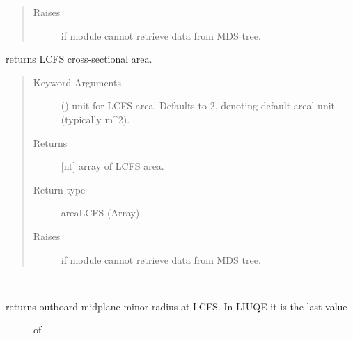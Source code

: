 \documentclass[letterpaper,10pt,english]{sphinxmanual}
\begin{document}
\begin{fulllineitems}
\begin{fulllineitems}
\begin{quote}
\begin{description}
\item[{Raises}] \leavevmode
{} \textendash{} if module cannot retrieve data from MDS tree.

\end{description}\end{quote}

\end{fulllineitems}


\begin{fulllineitems}
\label{\detokenize{eqtools:eqtools.TCVLIUQE.TCVLIUQETree.getAreaLCFS}}
returns LCFS cross-sectional area.
\begin{quote}\begin{description}
\item[{Keyword Arguments}] \leavevmode
{} () \textendash{} unit for LCFS area.  Defaults to 2,
denoting default areal unit (typically m\textasciicircum{}2).

\item[{Returns}] \leavevmode
{[}nt{]} array of LCFS area.

\item[{Return type}] \leavevmode
areaLCFS (Array)

\item[{Raises}] \leavevmode
{} \textendash{} if module cannot retrieve data from MDS tree.

\end{description}\end{quote}

\end{fulllineitems}


\begin{fulllineitems}
\label{\detokenize{eqtools:eqtools.TCVLIUQE.TCVLIUQETree.getAOut}}~\begin{description}
\item[{returns outboard-midplane minor radius at LCFS. In LIUQE it is the last value}] \leavevmode
of


\end{description}
\end{fulllineitems}
\end{fulllineitems}
\end{document}
